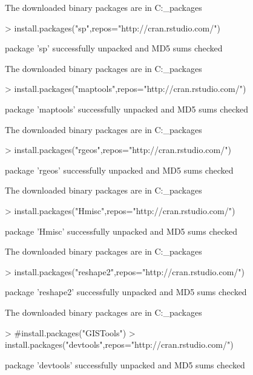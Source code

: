 \documentclass{article}
\begin{document}
\begin{Schunk}
\begin{Soutput}
The downloaded binary packages are in
	C:\Users\ramaka\AppData\Local\Temp{}\downloaded_packages
\end{Soutput}
\begin{Sinput}
> install.packages("sp",repos="http://cran.rstudio.com/")
\end{Sinput}
\begin{Soutput}
package 'sp' successfully unpacked and MD5 sums checked

The downloaded binary packages are in
	C:\Users\ramaka\AppData\Local\Temp{}\downloaded_packages
\end{Soutput}
\begin{Sinput}
> install.packages("maptools",repos="http://cran.rstudio.com/")
\end{Sinput}
\begin{Soutput}
package 'maptools' successfully unpacked and MD5 sums checked

The downloaded binary packages are in
	C:\Users\ramaka\AppData\Local\Temp{}\downloaded_packages
\end{Soutput}
\begin{Sinput}
> install.packages("rgeos",repos="http://cran.rstudio.com/")
\end{Sinput}
\begin{Soutput}
package 'rgeos' successfully unpacked and MD5 sums checked

The downloaded binary packages are in
	C:\Users\ramaka\AppData\Local\Temp{}\downloaded_packages
\end{Soutput}
\begin{Sinput}
> install.packages("Hmisc",repos="http://cran.rstudio.com/")
\end{Sinput}
\begin{Soutput}
package 'Hmisc' successfully unpacked and MD5 sums checked

The downloaded binary packages are in
	C:\Users\ramaka\AppData\Local\Temp{}\downloaded_packages
\end{Soutput}
\begin{Sinput}
> install.packages("reshape2",repos="http://cran.rstudio.com/")
\end{Sinput}
\begin{Soutput}
package 'reshape2' successfully unpacked and MD5 sums checked

The downloaded binary packages are in
	C:\Users\ramaka\AppData\Local\Temp{}\downloaded_packages
\end{Soutput}
\begin{Sinput}
> #install.packages("GISTools")
> install.packages("devtools",repos="http://cran.rstudio.com/")
\end{Sinput}
\begin{Soutput}
package 'devtools' successfully unpacked and MD5 sums checked


\end{Soutput}
\end{Schunk}
\end{document}
